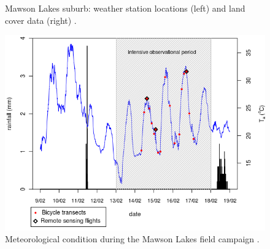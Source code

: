 \documentclass[final,3p,times,authoryear]{elsarticle}
\begin{document}
\begin{figure}[!htbp]
 \caption{Mawson Lakes suburb: weather station locations (left) and land cover data (right) \citep{Broadbent2016}.} \label{fig:mawson}
\end{figure}


\begin{figure}[!htbp]
\includegraphics[trim=0mm 0mm 0mm 0mm, clip,scale=0.5]{images/met3.png}
 \caption{Meteorological condition during the Mawson Lakes field campaign \citep{Broadbent2016}.} \label{fig:met3}
\end{figure}


%
%
\end{document}
